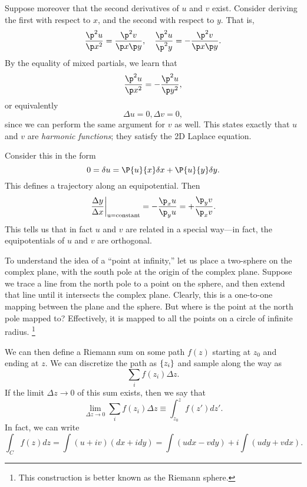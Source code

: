 Suppose moreover that the second derivatives of $u$ and $v$ exist. Consider deriving the first with respect to $x$, and the second with respect to $y$. That is,
\begin{equation}
    \frac{\p^2 u}{\p x^2} = \frac{\p^2 v}{\p x \p y}, \quad \frac{\p^2 u}{\p^2 y} = -\frac{\p^2 v}{\p x \p y}.
\end{equation}
By the equality of mixed partials, we learn that
\begin{equation}
    \frac{\p^2 u}{\p x^2} = - \frac{\p^2 u}{\p y^2},
\end{equation}
or equivalently
\begin{equation}
    \Delta u = 0, \Delta v = 0,
\end{equation}
since we can perform the same argument for $v$ as well. This states exactly that $u$ and $v$ are \emph{harmonic functions}; they satisfy the 2D Laplace equation.

Consider this in the form
\begin{equation}
    0 = \delta u = \P{u}{x} \delta x  + \P{u}{y} \delta y.
\end{equation}
This defines a trajectory along an equipotential. Then
\begin{equation}
    \left.\frac{\Delta y}{\Delta x}\right|_\text{u=\text{constant}} = -\frac{\p_x u}{\p_y u} = + \frac{\p_y v}{\p_x v}.
\end{equation}
This tells us that in fact $u$ and $v$ are related in a special way---in fact, the equipotentials of $u$ and $v$ are orthogonal.

To understand the idea of a ``point at infinity,'' let us place a two-sphere on the complex plane, with the south pole at the origin of the complex plane. Suppose we trace a line from the north pole to a point on the sphere, and then extend that line until it intersects the complex plane. Clearly, this is a one-to-one mapping between the plane and the sphere. But where is the point at the north pole mapped to? Effectively, it is mapped to all the points on a circle of infinite radius.%
    \footnote{This construction is better known as the Riemann sphere.}

We can then define a Riemann sum on some path $f(z)$ starting at $z_0$ and ending at $z$. We can discretize the path as $\{z_i\}$ and sample along the way as
\begin{equation}
    \sum_i f(z_i) \Delta z.
\end{equation}
If the limit $\Delta z \to 0$ of this sum exists, then we say that
\begin{equation}
    \lim_{\Delta z  \to 0} \sum_i f(z_i) \Delta z \equiv \int_{z_0}^z f(z') dz'.
\end{equation}
In fact, we can write
\begin{equation}
    \int_C f(z) dz = \int (u+iv) (dx+idy) = \int(udx - vdy) + i \int(u dy + vdx).
\end{equation}